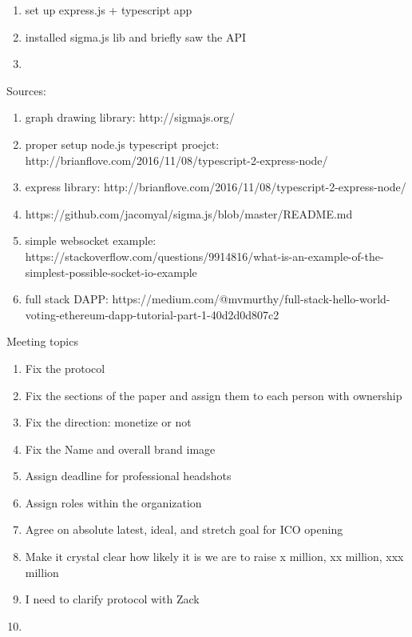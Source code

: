 \begin{enumerate}
	\item set up express.js + typescript app
	\item installed sigma.js lib and briefly saw the API
	\item 
\end{enumerate}

Sources:

\begin{enumerate}
	\item graph drawing library: http://sigmajs.org/
	\item proper setup node.js typescript proejct: http://brianflove.com/2016/11/08/typescript-2-express-node/
	\item express library: http://brianflove.com/2016/11/08/typescript-2-express-node/
	\item https://github.com/jacomyal/sigma.js/blob/master/README.md
	\item simple websocket example: https://stackoverflow.com/questions/9914816/what-is-an-example-of-the-simplest-possible-socket-io-example
	\item full stack DAPP: https://medium.com/@mvmurthy/full-stack-hello-world-voting-ethereum-dapp-tutorial-part-1-40d2d0d807c2
\end{enumerate}


Meeting topics

\begin{enumerate}
	\item Fix the protocol
	\item Fix the sections of the paper and assign them to each person with ownership
	\item Fix the direction: monetize or not
	\item Fix the Name and overall brand image
	\item Assign deadline for professional headshots
	\item Assign roles within the organization
	\item Agree on absolute latest, ideal, and stretch goal for ICO opening
	\item Make it crystal clear how likely it is we are to raise x million, xx million, xxx million
	\item I need to clarify protocol with Zack
	\item 
\end{enumerate}


